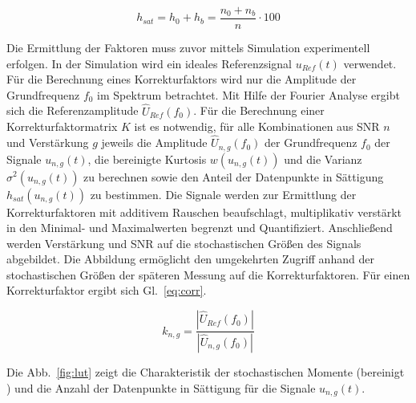 \begin{equation}
	\label{eq:dist_sat}
	h_{sat} = h_0 + h_b = \frac{n_0 + n_b}{n} \cdot 100
\end{equation}




Die Ermittlung der Faktoren muss zuvor mittels Simulation experimentell erfolgen. In der Simulation wird ein ideales Referenzsignal $u_{Ref}(t)$ verwendet. Für die Berechnung eines Korrekturfaktors wird nur die Amplitude der Grundfrequenz $f_0$ im Spektrum betrachtet. Mit Hilfe der Fourier Analyse ergibt sich die Referenzamplitude $\hat{U}_{Ref}(f_0)$. Für die Berechnung einer Korrekturfaktormatrix $K$ ist es notwendig, für alle Kombinationen aus SNR $n$ und Verstärkung $g$ jeweils die Amplitude $\hat{U}_{n,g}(f_0)$ der Grundfrequenz $f_0$ der Signale $u_{n,g}(t)$, die bereinigte Kurtosis $w(u_{n,g}(t))$ und die Varianz $\sigma^2(u_{n,g}(t))$ zu berechnen sowie den Anteil der Datenpunkte in Sättigung $h_{sat}(u_{n,g}(t))$ zu bestimmen. Die Signale werden zur Ermittlung der Korrekturfaktoren mit additivem Rauschen beaufschlagt, multiplikativ verstärkt in den Minimal- und Maximalwerten begrenzt und Quantifiziert. Anschließend werden Verstärkung und SNR auf die stochastischen Größen des Signals abgebildet. Die Abbildung ermöglicht den umgekehrten Zugriff anhand der stochastischen Größen der späteren Messung auf die Korrekturfaktoren.
Für einen Korrekturfaktor ergibt sich Gl.~\eqref{eq:corr}.

\begin{equation}
	\label{eq:corr}
k_{n,g} = \frac{|\hat{U}_{Ref}(f_0)|}{|\hat{U}_{n,g}(f_0)|} %
\end{equation}

Die Abb.~\ref{fig:lut} zeigt die Charakteristik der stochastischen Momente (bereinigt ) und die Anzahl der Datenpunkte in Sättigung für die Signale $u_{n,g}(t)$. 

